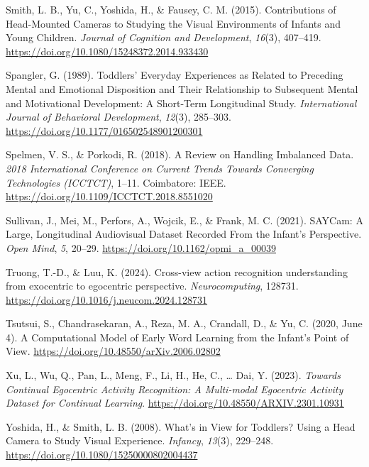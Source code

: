 \documentclass[
  man,floatsintext]{apa6}
\newlength{\cslhangindent}
\newenvironment{CSLReferences}[2] %
 {\begin{list}{}{%
  \setlength{\itemindent}{0pt}
  \setlength{\leftmargin}{0pt}
  \setlength{\parsep}{0pt}
  \ifodd #1
   \setlength{\leftmargin}{\cslhangindent}
   \setlength{\itemindent}{-1\cslhangindent}
  \fi
  \setlength{\itemsep}{#2\baselineskip}}}
 {\end{list}}
\begin{document}
\begin{CSLReferences}{1}{0}
Smith, L. B., Yu, C., Yoshida, H., \& Fausey, C. M. (2015). Contributions of {Head-Mounted Cameras} to {Studying} the {Visual Environments} of {Infants} and {Young Children}. \emph{Journal of Cognition and Development}, \emph{16}(3), 407--419. \url{https://doi.org/10.1080/15248372.2014.933430}

Spangler, G. (1989). Toddlers' {Everyday Experiences} as {Related} to {Preceding Mental} and {Emotional Disposition} and {Their Relationship} to {Subsequent Mental} and {Motivational Development}: {A Short-Term Longitudinal Study}. \emph{International Journal of Behavioral Development}, \emph{12}(3), 285--303. \url{https://doi.org/10.1177/016502548901200301}

Spelmen, V. S., \& Porkodi, R. (2018). A {Review} on {Handling Imbalanced Data}. \emph{2018 {International Conference} on {Current Trends} Towards {Converging Technologies} ({ICCTCT})}, 1--11. Coimbatore: IEEE. \url{https://doi.org/10.1109/ICCTCT.2018.8551020}

Sullivan, J., Mei, M., Perfors, A., Wojcik, E., \& Frank, M. C. (2021). {SAYCam}: {A Large}, {Longitudinal Audiovisual Dataset Recorded From} the {Infant}'s {Perspective}. \emph{Open Mind}, \emph{5}, 20--29. \url{https://doi.org/10.1162/opmi_a_00039}

Truong, T.-D., \& Luu, K. (2024). Cross-view action recognition understanding from exocentric to egocentric perspective. \emph{Neurocomputing}, 128731. \url{https://doi.org/10.1016/j.neucom.2024.128731}

Tsutsui, S., Chandrasekaran, A., Reza, M. A., Crandall, D., \& Yu, C. (2020, June 4). A {Computational Model} of {Early Word Learning} from the {Infant}'s {Point} of {View}. \url{https://doi.org/10.48550/arXiv.2006.02802}

Xu, L., Wu, Q., Pan, L., Meng, F., Li, H., He, C., \ldots{} Dai, Y. (2023). \emph{Towards {Continual Egocentric Activity Recognition}: {A Multi-modal Egocentric Activity Dataset} for {Continual Learning}}. \url{https://doi.org/10.48550/ARXIV.2301.10931}

Yoshida, H., \& Smith, L. B. (2008). What's in {View} for {Toddlers}? {Using} a {Head Camera} to {Study Visual Experience}. \emph{Infancy}, \emph{13}(3), 229--248. \url{https://doi.org/10.1080/15250000802004437}

\end{CSLReferences}
\end{document}
